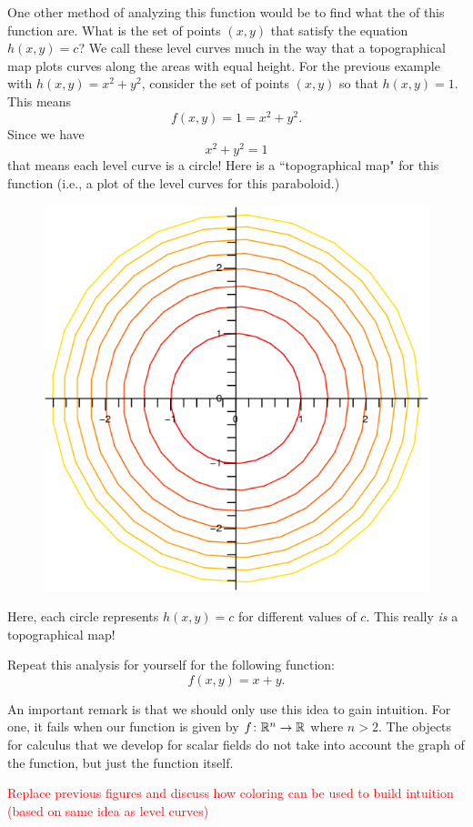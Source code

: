                 One other method of analyzing this function would be to find what the  of this function are.  What is the set of points $(x,y)$ that satisfy the equation $h(x,y)=c$?  We call these level curves much in the way that a topographical map plots curves along the areas with equal height.  For the previous example with $h(x,y)=x^2+y^2$, consider the set of points $(x,y)$ so that $h(x,y)=1.$ This means
                \[
                f(x,y)=1=x^2+y^2.
                \]
                Since we have
                \[
                x^2+y^2=1
                \]
                that means each level curve is a circle! Here is a ``topographical map" for this function (i.e., a plot of the level curves for this paraboloid.)
                \begin{figure}[H]
                    \centering
                    \includegraphics[width=.4\textwidth]{Figures_Part_6/parabolic_level_curves.png}
                \end{figure}
                Here, each circle represents $h(x,y)=c$ for different values of $c$.  This really \emph{is} a topographical map!
                
                
                \begin{exercise}[Plane]
                Repeat this analysis for yourself for the following function:
                \[
                f(x,y)=x+y.
                \]
                \end{exercise}
                
                An important remark is that we should only use this idea to gain intuition. For one, it fails when our function is given by $f\colon \mathbb{R}^n \to \mathbb{R}$ where $n>2$.  The objects for calculus that we develop for scalar fields do not take into account the graph of the function, but just the function itself.  

            \textcolor{red}{Replace previous figures and discuss how coloring can be used to build intuition (based on same idea as level curves)}
                
